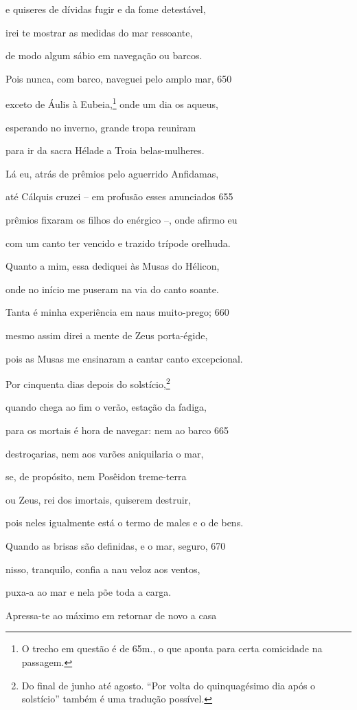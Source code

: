 e quiseres de dívidas fugir e da fome detestável,

irei te mostrar as medidas do mar ressoante,

de modo algum sábio em navegação ou barcos.

Pois nunca, com barco, naveguei pelo amplo mar, \num{650}

exceto de Áulis à Eubeia,\footnote{O trecho em questão é de 65m., o que aponta para certa comicidade na passagem.} onde um dia os aqueus,

esperando no inverno, grande tropa reuniram

para ir da sacra Hélade a Troia belas-mulheres.

Lá eu, atrás de prêmios pelo aguerrido Anfidamas,

até Cálquis cruzei -- em profusão esses anunciados \num{655}

prêmios fixaram os filhos do enérgico --, onde afirmo eu

com um canto ter vencido e trazido trípode orelhuda.

Quanto a mim, essa dediquei às Musas do Hélicon,

onde no início me puseram na via do canto soante.

Tanta é minha experiência em naus muito-prego; \num{660}

mesmo assim direi a mente de Zeus porta-égide,

pois as Musas me ensinaram a cantar canto excepcional.

Por cinquenta dias depois do solstício,\footnote{Do final de junho até agosto. ``Por volta do quinquagésimo dia após o solstício'' também é uma tradução possível.}

quando chega ao fim o verão, estação da fadiga,

para os mortais é hora de navegar: nem ao barco \num{665}

destroçarias, nem aos varões aniquilaria o mar,

se, de propósito, nem Posêidon treme-terra

ou Zeus, rei dos imortais, quiserem destruir,

pois neles igualmente está o termo de males e o de bens.

Quando as brisas são definidas, e o mar, seguro, \num{670}

nisso, tranquilo, confia a nau veloz aos ventos,

puxa-a ao mar e nela põe toda a carga.

Apressa-te ao máximo em retornar de novo a casa


